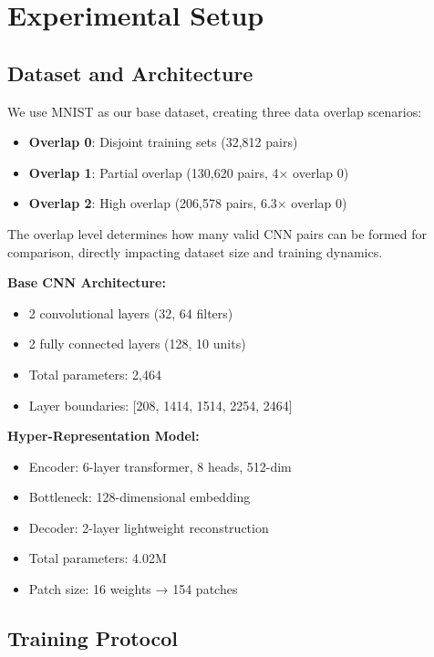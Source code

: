 \section{Experimental Setup}
\label{sec:experiments}

\subsection{Dataset and Architecture}

We use MNIST as our base dataset, creating three data overlap scenarios:
\begin{itemize}
    \item \textbf{Overlap 0}: Disjoint training sets (32,812 pairs)
    \item \textbf{Overlap 1}: Partial overlap (130,620 pairs, 4× overlap 0)
    \item \textbf{Overlap 2}: High overlap (206,578 pairs, 6.3× overlap 0)
\end{itemize}

The overlap level determines how many valid CNN pairs can be formed for comparison, directly impacting dataset size and training dynamics.

\textbf{Base CNN Architecture:}
\begin{itemize}
    \item 2 convolutional layers (32, 64 filters)
    \item 2 fully connected layers (128, 10 units)
    \item Total parameters: 2,464
    \item Layer boundaries: [208, 1414, 1514, 2254, 2464]
\end{itemize}

\textbf{Hyper-Representation Model:}
\begin{itemize}
    \item Encoder: 6-layer transformer, 8 heads, 512-dim
    \item Bottleneck: 128-dimensional embedding
    \item Decoder: 2-layer lightweight reconstruction
    \item Total parameters: 4.02M
    \item Patch size: 16 weights → 154 patches
\end{itemize}

\subsection{Training Protocol}

